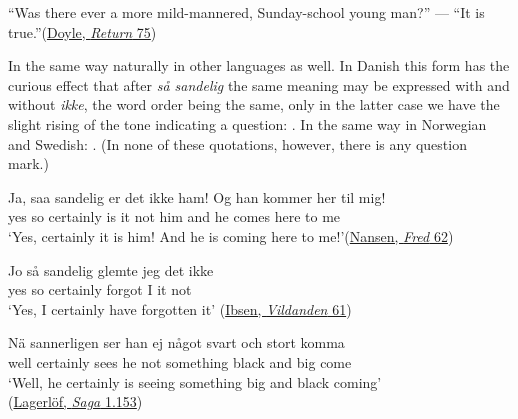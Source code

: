 \ea \label{ex:04-13}
``Was there ever a more mild-mannered, Sunday-school young man?'' --- ``It is true.''\hfill(\href{https://archive.org/details/returnofsherlock0000acon/page/48/mode/2up?view=theater&q=\%22was+there+ever%22}{Doyle, \textit{Return} 75}) %
\z
{}
 
In the same way naturally in other languages as well. In Danish this form has the curious effect that after \textit{så sandelig} the same meaning may be expressed with and without \textit{ikke}, the word order being the same, only in the latter case we have the slight rising of the tone indicating a question: . In the same way in Norwegian and Swedish: . (In none of these quotations, however, there is any question mark.)

\ea \label{ex:04-14}
\gll Ja, saa sandelig er det ikke ham! Og han kommer her til mig!\\
 yes so certainly is it not him and he comes here to me\\
\glt `Yes, certainly it is him! And he is coming here to me!'\hfill(\href{https://archive.org/details/guds-fred/page/62/mode/2up?q=\%22saa+sandelig+er+det+ikke\%22&view=theater}{Nansen, \textit{Fred} 62})
\z

\ea \label{ex:04-15}
\ea
\gll Jo så sandelig glemte jeg det ikke\\
 yes so certainly forgot I it not\\
\glt `Yes, I certainly have forgotten it'
\hfill(\href{https://archive.org/details/vildandenskuesp00ibsegoog/page/n69/mode/2up?q=\%22glemte+jeg+det+ikke\%22&view=theater}{Ibsen, \textit{Vildanden} 61})


\ex{}
\gll Nä sannerligen ser han ej något svart och stort komma\\
 well certainly sees he not something black and big come\\
\glt `Well, he certainly is seeing  something big and black coming'\\
\hfill(\href{https://archive.org/details/arkivkopia.se-littbank-LagerlofS_GostaBerling1/page/n61/mode/2up?q=\%22sannerligen+ser+han+ej+n%C3%A5got\%22&view=theater}{Lagerlöf, \textit{Saga} 1.153}) %
\z
\z

